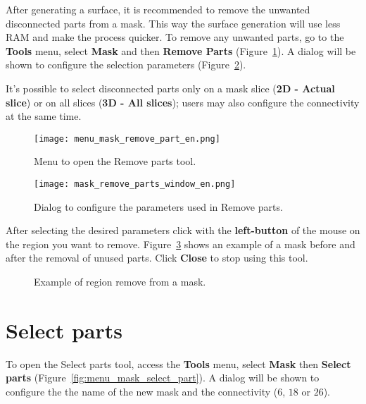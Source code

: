 After generating a surface, it is recommended to remove the unwanted disconnected parts from a mask. This way the surface generation will use less RAM and make the process quicker. To remove any unwanted parts, go to the \textbf{Tools} menu, select \textbf{Mask} and then \textbf{Remove Parts} (Figure~\ref{fig:menu_mask_remove_part}). A dialog will be shown to configure the selection parameters  (Figure~\ref{fig:mask_remove_parts_window}).

It’s possible to select disconnected parts only on a mask slice (\textbf{2D - Actual slice}) or on all slices (\textbf{3D - All slices}); users may also configure the connectivity at the same time.

\begin{figure}[!htb]
\centering
\texttt{[image: menu\_mask\_remove\_part\_en.png]}
\caption{Menu to open the Remove parts tool.}
\label{fig:menu_mask_remove_part}
\end{figure}

\begin{figure}[!htb]
\centering
\texttt{[image: mask\_remove\_parts\_window\_en.png]}
\caption{Dialog to configure the parameters used in Remove parts.}
\label{fig:mask_remove_parts_window}
\end{figure}

After selecting the desired parameters click with the \textbf{left-button} of the mouse on the region you want to remove. Figure~\ref{fig:mask_removed_part} shows an example of a mask before and after the removal of unused parts. Click \textbf{Close} to stop using this tool.

\begin{figure}[!htb]
  \centering
    \qquad
  \hfill
  \caption{Example of region remove from a mask.}
  \label{fig:mask_removed_part}
\end{figure}

\section{Select parts}

To open the Select parts tool, access the \textbf{Tools} menu, select \textbf{Mask} then \textbf{Select parts} (Figure~\ref{fig:menu_mask_select_part}). A dialog will be shown to configure the the name of the new mask and the connectivity ($6$, $18$ or $26$).

